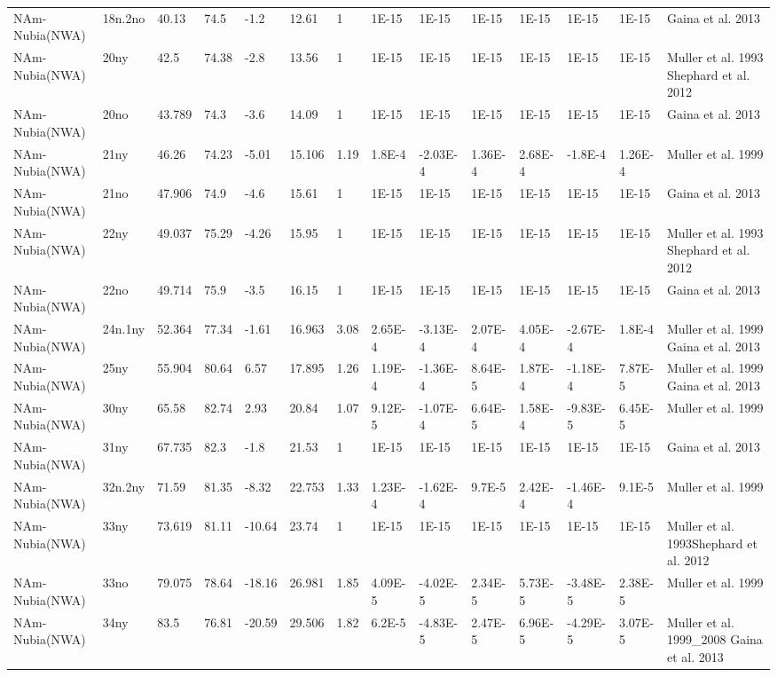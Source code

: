 \begin{landscape}
\begin{longtable}{@{}lllllllllllllp{3.5cm}@{}}
NAm-Nubia(NWA) & 18n.2no & 40.13 & 74.5 & -1.2 & 12.61 & 1 & 1E-15 & 1E-15 & 1E-15 & 1E-15 & 1E-15 & 1E-15 & Gaina et al. 2013 \\
NAm-Nubia(NWA) & 20ny & 42.5 & 74.38 & -2.8 & 13.56 & 1 & 1E-15 & 1E-15 & 1E-15 & 1E-15 & 1E-15 & 1E-15 & Muller et al. 1993 Shephard et al. 2012 \\
NAm-Nubia(NWA) & 20no & 43.789 & 74.3 & -3.6 & 14.09 & 1 & 1E-15 & 1E-15 & 1E-15 & 1E-15 & 1E-15 & 1E-15 & Gaina et al. 2013 \\
NAm-Nubia(NWA) & 21ny & 46.26 & 74.23 & -5.01 & 15.106 & 1.19 & 1.8E-4 & -2.03E-4 & 1.36E-4 & 2.68E-4 & -1.8E-4 & 1.26E-4 & Muller et al. 1999 \\
NAm-Nubia(NWA) & 21no & 47.906 & 74.9 & -4.6 & 15.61 & 1 & 1E-15 & 1E-15 & 1E-15 & 1E-15 & 1E-15 & 1E-15 & Gaina et al. 2013 \\
NAm-Nubia(NWA) & 22ny & 49.037 & 75.29 & -4.26 & 15.95 & 1 & 1E-15 & 1E-15 & 1E-15 & 1E-15 & 1E-15 & 1E-15 & Muller et al. 1993 Shephard et al. 2012 \\
NAm-Nubia(NWA) & 22no & 49.714 & 75.9 & -3.5 & 16.15 & 1 & 1E-15 & 1E-15 & 1E-15 & 1E-15 & 1E-15 & 1E-15 & Gaina et al. 2013 \\
NAm-Nubia(NWA) & 24n.1ny & 52.364 & 77.34 & -1.61 & 16.963 & 3.08 & 2.65E-4 & -3.13E-4 & 2.07E-4 & 4.05E-4 & -2.67E-4 & 1.8E-4 & Muller et al. 1999 Gaina et al. 2013 \\
NAm-Nubia(NWA) & 25ny & 55.904 & 80.64 & 6.57 & 17.895 & 1.26 & 1.19E-4 & -1.36E-4 & 8.64E-5 & 1.87E-4 & -1.18E-4 & 7.87E-5 & Muller et al. 1999 Gaina et al. 2013 \\
NAm-Nubia(NWA) & 30ny & 65.58 & 82.74 & 2.93 & 20.84 & 1.07 & 9.12E-5 & -1.07E-4 & 6.64E-5 & 1.58E-4 & -9.83E-5 & 6.45E-5 & Muller et al. 1999 \\
NAm-Nubia(NWA) & 31ny & 67.735 & 82.3 & -1.8 & 21.53 & 1 & 1E-15 & 1E-15 & 1E-15 & 1E-15 & 1E-15 & 1E-15 & Gaina et al. 2013 \\
NAm-Nubia(NWA) & 32n.2ny & 71.59 & 81.35 & -8.32 & 22.753 & 1.33 & 1.23E-4 & -1.62E-4 & 9.7E-5 & 2.42E-4 & -1.46E-4 & 9.1E-5 & Muller et al. 1999 \\
NAm-Nubia(NWA) & 33ny & 73.619 & 81.11 & -10.64 & 23.74 & 1 & 1E-15 & 1E-15 & 1E-15 & 1E-15 & 1E-15 & 1E-15 & Muller et al. 1993Shephard et al. 2012 \\
NAm-Nubia(NWA) & 33no & 79.075 & 78.64 & -18.16 & 26.981 & 1.85 & 4.09E-5 & -4.02E-5 & 2.34E-5 & 5.73E-5 & -3.48E-5 & 2.38E-5 & Muller et al. 1999 \\
NAm-Nubia(NWA) & 34ny & 83.5 & 76.81 & -20.59 & 29.506 & 1.82 & 6.2E-5 & -4.83E-5 & 2.47E-5 & 6.96E-5 & -4.29E-5 & 3.07E-5 & Muller et al. 1999\_2008 Gaina et al. 2013 \\

\end{longtable}
\end{landscape}
